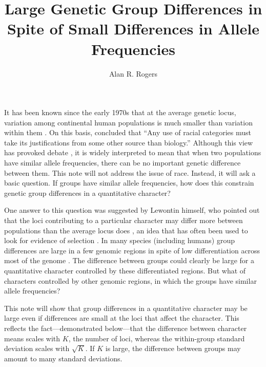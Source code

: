 \documentclass[11pt]{article}
\begin{document}
\title{Large Genetic Group Differences in Spite of Small Differences
  in Allele Frequencies}
\author{Alan R. Rogers}
\maketitle

It has been known since the early 1970s that at the average genetic
locus, variation among continental human populations is much smaller
than variation within them \citep{Lewontin:EB-6-381, Nei:S-177-434,
  Nei:AJH-26-421}.  On this basis, \citet[p.~127]{Lewontin:NOG-84}
concluded that ``Any use of racial categories must take its
justifications from some other source than biology.'' Although this
view has provoked debate \citep{Spielman:AJH-28-317,
  Mitton:AN-111-203, Edwards:BE-25-798, Crow:D-131-81,
  Roseman:BE-43-2100204, Shen:PRS-377-20200417, Hochman:RRG-22}, it is
widely interpreted to mean that when two populations have similar
allele frequencies, there can be no important genetic difference
between them. This note will not address the issue of race. Instead,
it will ask a basic question. If groups have similar allele
frequencies, how does this constrain genetic group differences in a
quantitative character?

One answer to this question was suggested by Lewontin himself, who
pointed out that the loci contributing to a particular character may
differ more between populations than the average locus does
\citep{Lewontin+Krakauer:73}, an idea that has often been used to look
for evidence of selection
\parencites[e.g.{}][]{Rogers+Harpending:QuantitativeCharacters}{Norton:MBE-24-710}. In
many species (including humans) group differences are large in a few
genomic regions in spite of low differentiation across most of the
genome \citep{Akey:GR-12-1805, Turner:PLO-3-e285,
  Cruickshank:ME-23-3133, Nosil:PRS-279-5058}. The difference between
groups could clearly be large for a quantitative character controlled
by these differentiated regions. But what of characters controlled by
other genomic regions, in which the groups have similar allele
frequencies?

This note will show that group differences in a quantitative character
may be large even if differences are small at the loci that affect the
character. This reflects the fact---demonstrated below---that the
difference between character means scales with $K$, the number of
loci, whereas the within-group standard deviation scales with
$\sqrt{K}$. If $K$ is large, the difference between groups may amount
to many standard deviations.
\end{document}
